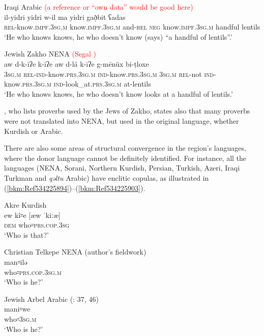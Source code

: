 \documentclass[output=paper]{langsci/langscibook}
\begin{document}
\ea\label{bkm:Ref534225045}Iraqi Arabic \textcolor{red}{(a reference or ``own data'' would be good here)}\\
\gll il-yidri   yidri     w-il ma yidri     gað̣bit ʕadas\\
    \textsc{rel}\textup{{}-know.}\textsc{impf.3sg.m} \textup{know.}\textsc{impf.3sg.m} \textup{and-}\textsc{rel} \textsc{neg} \textup{know.}\textsc{impf.3sg.m} handful lentils\\
\glt ‘He who knows knows, he who doesn’t know (says) “a handful of lentils”.’\z

\ea\label{bkm:Ref534225057}Jewish Zakho NENA \textcolor{red}{(Segal \citeyear[262]{Segal1955})}\\
\gll aw d-k-īʔe   k-īʔe     aw d-lá k-īʔe   g-mēnüx bi-ṭloxe\\
    \textsc{3sg.m} \textsc{rel}\textup{{}-}\textsc{ind-}\textup{know}\textsc{.prs.3sg.m} \textsc{ind}\textup{{}-know.}\textsc{prs.3sg.m} \textsc{3sg.m} \textsc{rel}\textup{{}-not} \textsc{ind}\textup{{}-know.}\textsc{prs.3sg.m} \textsc{ind-}\textup{look\_at.}\textsc{prs}.\textsc{3sg.m} \textup{at-lentils}\\
\glt ‘He who knows knows, he who doesn’t know looks at a handful of lentils.’\z

\citet{Sabar1978}, who lists proverbs used by the Jews of Zakho, states also that many proverbs were not translated into NENA, but used in the original language, whether Kurdish or Arabic.

There are also some areas of structural convergence in the region’s languages, where the donor language cannot be definitely identified. For instance, all the languages (NENA, Sorani, Northern Kurdish, Persian, Turkish, Azeri, Iraqi Turkman and \textit{qəltu} Arabic) have enclitic copulas, as illustrated in (\ref{bkm:Ref534225894})–(\ref{bkm:Ref534225903}).

\ea\label{bkm:Ref534225894}Akre Kurdish \citep[175]{MacKenzie1961}\\
\gll ew kî꞊e \textup{[æw \textcolor{red}{ˈ}kiːæ]}\\
     \textsc{dem} who꞊\textsc{prs.cop.3sg}\\
\glt ‘Who is that?’ 
\z

\ea Christian Telkepe NENA (author’s fieldwork)\\
\gll man꞊ilə\\
     who꞊\textsc{prs.cop.3sg.m}\\
\glt ‘Who is he?’\z

\ea\label{bkm:Ref534225903}Jewish Arbel Arabic (\citealt{Jastrow1990book}: 37, 46) \\
\gll mani꞊we\\
     who꞊\textsc{3sg.m}\\
\glt ‘Who is he?’\z
\end{document}
